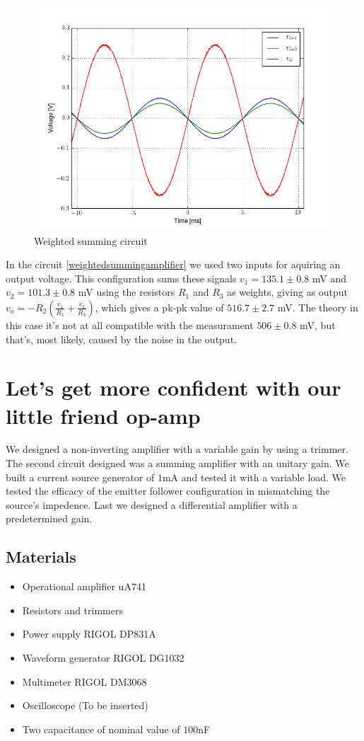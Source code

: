 \documentclass[oneside]{book}
\begin{document}
\begin{figure}[H]
\centering
\includegraphics[width=.7\textwidth]{img/scope5.png}
\caption{Weighted summing circuit}
\end{figure}
In the circuit \eqref{weightedsummingamplifier} we used two inputs for aquiring an output voltage. This configuration sums these signals $v_1 = 135.1\pm 0.8$ mV and $v_2 = 101.3\pm 0.8$ mV using the resistors $R_1$ and $R_3$ as weights, giving as output $v_o = - R_2 (\frac{v_1}{R_1} + \frac{v_2}{R_3})$, which gives a pk-pk value of $516.7\pm 2.7$ mV. The theory in this case it's not at all compatible with the measurament $506\pm 0.8$ mV, but that's, most likely, caused by the noise in the output.
\chapter{Let's get more confident with our little friend op-amp}
We designed a non-inverting amplifier with a variable gain by using a trimmer. The second circuit designed was a summing amplifier with an unitary gain. We built a current source generator of $1$mA and tested it with a variable load. We tested the efficacy of the emitter follower configuration in mismatching the source's impedence. Last we designed a differential amplifier with a predetermined gain.
\section{Materials}
\begin{itemize}
\item Operational amplifier uA741
\item Resistors and trimmers
\item Power supply RIGOL DP831A
\item Waveform generator RIGOL DG1032
\item Multimeter RIGOL DM3068
\item Oscilloscope (To be inserted)
\item Two capacitance of nominal value of $100$nF
\end{itemize}
\end{document}
